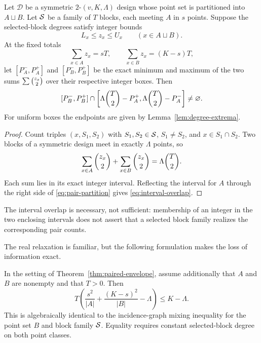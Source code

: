 \begin{theorem}\label{thm:paired-envelope}
Let \(\mathcal D\) be a symmetric \(2\)-\((v,K,\Lambda)\) design whose point
set is partitioned into \(A\sqcup B\).  Let \(\mathcal S\) be a family of \(T\)
blocks, each meeting \(A\) in \(s\) points.  Suppose the selected-block
degrees satisfy integer bounds
\[
 L_x\le z_x\le U_x\qquad(x\in A\sqcup B).
\]
At the fixed totals
\[
 \sum_{x\in A}z_x=sT,
 \qquad
 \sum_{x\in B}z_x=(K-s)T,
\]
let \([P_A^-,P_A^+]\) and \([P_B^-,P_B^+]\) be the exact minimum and maximum
of the two sums \(\sum\binom{z_x}{2}\) over their respective integer boxes.
Then
\begin{equation}\label{eq:interval-overlap}
 [P_B^-,P_B^+]
 \cap
 \left[\Lambda\binom{T}{2}-P_A^+,
       \Lambda\binom{T}{2}-P_A^-\right]\ne\varnothing.
\end{equation}
For uniform boxes the endpoints are given by
Lemma~\ref{lem:degree-extrema}.
\end{theorem}

\begin{proof}
Count triples \((x,S_1,S_2)\) with \(S_1,S_2\in\mathcal S\), \(S_1\ne S_2\), and
\(x\in S_1\cap S_2\).  Two blocks of a symmetric design meet in exactly
\(\Lambda\) points, so
\begin{equation}\label{eq:pair-partition}
 \sum_{x\in A}\binom{z_x}{2}
 +\sum_{x\in B}\binom{z_x}{2}
 =\Lambda\binom{T}{2}.
\end{equation}
Each sum lies in its exact integer interval.  Reflecting the interval for
\(A\) through the right side of \eqref{eq:pair-partition} gives
\eqref{eq:interval-overlap}.
\end{proof}

The interval overlap is necessary, not sufficient: membership of an integer
in the two enclosing intervals does not assert that a selected block family
realizes the corresponding pair counts.

The real relaxation is familiar, but the following formulation makes the
loss of information exact.

\begin{corollary}
\label{cor:mixing-relaxation}
In the setting of Theorem~\ref{thm:paired-envelope}, assume additionally that
\(A\) and \(B\) are nonempty and that \(T>0\).  Then
\begin{equation}\label{eq:real-relaxation}
 T\left(\frac{s^2}{|A|}+\frac{(K-s)^2}{|B|}-\Lambda\right)
 \le K-\Lambda.
\end{equation}
This is algebraically identical to the incidence-graph mixing inequality for
the point set \(B\) and block family \(\mathcal S\).  Equality requires constant
selected-block degree on both point classes.
\end{corollary}

